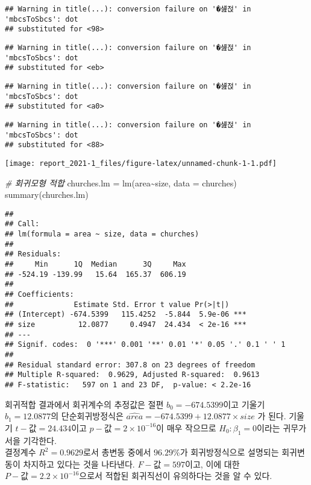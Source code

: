 \documentclass[
]{article}
\newenvironment{Shaded}{\begin{snugshade}}{\end{snugshade}}
\newcommand{\AttributeTok}[1]{\textcolor[rgb]{0.77,0.63,0.00}{#1}}
\newcommand{\CommentTok}[1]{\textcolor[rgb]{0.56,0.35,0.01}{\textit{#1}}}
\newcommand{\FunctionTok}[1]{\textcolor[rgb]{0.00,0.00,0.00}{#1}}
\newcommand{\NormalTok}[1]{#1}
\newcommand{\OtherTok}[1]{\textcolor[rgb]{0.56,0.35,0.01}{#1}}
\newcommand{\SpecialCharTok}[1]{\textcolor[rgb]{0.00,0.00,0.00}{#1}}
\begin{document}
\begin{verbatim}
## Warning in title(...): conversion failure on '�섎젅' in 'mbcsToSbcs': dot
## substituted for <98>
\end{verbatim}

\begin{verbatim}
## Warning in title(...): conversion failure on '�섎젅' in 'mbcsToSbcs': dot
## substituted for <eb>
\end{verbatim}

\begin{verbatim}
## Warning in title(...): conversion failure on '�섎젅' in 'mbcsToSbcs': dot
## substituted for <a0>
\end{verbatim}

\begin{verbatim}
## Warning in title(...): conversion failure on '�섎젅' in 'mbcsToSbcs': dot
## substituted for <88>
\end{verbatim}

\texttt{[image: report\_2021-1\_files/figure-latex/unnamed-chunk-1-1.pdf]}

\begin{Shaded}
\begin{Highlighting}[]
\CommentTok{\# 회귀모형 적합}
\NormalTok{churches.lm }\OtherTok{=} \FunctionTok{lm}\NormalTok{(area}\SpecialCharTok{\textasciitilde{}}\NormalTok{size, }\AttributeTok{data =}\NormalTok{ churches)}
\FunctionTok{summary}\NormalTok{(churches.lm)}
\end{Highlighting}
\end{Shaded}

\begin{verbatim}
## 
## Call:
## lm(formula = area ~ size, data = churches)
## 
## Residuals:
##     Min      1Q  Median      3Q     Max 
## -524.19 -139.99   15.64  165.37  606.19 
## 
## Coefficients:
##              Estimate Std. Error t value Pr(>|t|)    
## (Intercept) -674.5399   115.4252  -5.844  5.9e-06 ***
## size          12.0877     0.4947  24.434  < 2e-16 ***
## ---
## Signif. codes:  0 '***' 0.001 '**' 0.01 '*' 0.05 '.' 0.1 ' ' 1
## 
## Residual standard error: 307.8 on 23 degrees of freedom
## Multiple R-squared:  0.9629, Adjusted R-squared:  0.9613 
## F-statistic:   597 on 1 and 23 DF,  p-value: < 2.2e-16
\end{verbatim}

회귀적합 결과에서 회귀계수의 추정값은 절편 \(b_0 = -674.5399\)이고
기울기 \(b_1=12.0877\)의 단순회귀방정식은
\(\hat{area}=-674.5399 + 12.0877 \times size\) 가 된다. 기울기
\(t-값=24.434\)이고 \(p-값=2\times10^{-16}\)이 매우 작으므로
\(H_0:\beta_1=0\)이라는 귀무가서을 기각한다.\\
결정계수 \(R^2=0.9629\)로서 총변동 중에서 \(96.29\)\%가 회귀방정식으로
설명되는 회귀변동이 차지하고 있다는 것을 나타낸다. \(F-값=597\)이고,
이에 대한 \(P-값=2.2\times10^{-16}\)으로서 적합된 회귀직선이 유의하다는
것을 알 수 있다.\\
\end{document}
